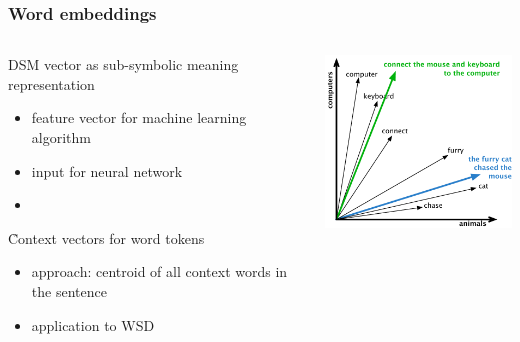 \documentclass[t]{beamer} %
\begin{document}
\begin{frame}
  \frametitle{Word embeddings}

  \gap
  \begin{columns}[c]
    \begin{column}{50mm}
      DSM vector as sub-symbolic meaning representation
      \begin{itemize}
      \item feature vector for machine learning algorithm
      \item input for neural network
      \item[]
      \end{itemize}

      \h{Context vectors} for word tokens \citep{Schuetze:98} 
      \begin{itemize}
      \item {} approach:
        centroid of all context words in the sentence
      \item application to WSD
      \end{itemize}
    \end{column}
    \begin{column}{60mm}
      \includegraphics[width=60mm]{img/illustration_context_vectors_mouse}
    \end{column}
  \end{columns}
\end{frame}
\end{document}
